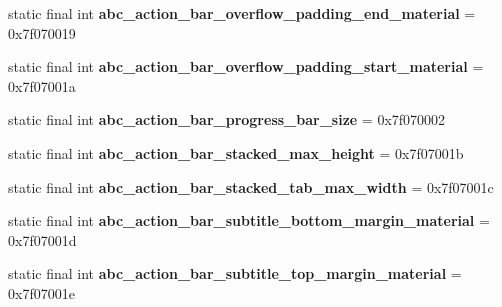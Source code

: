 \begin{DoxyCompactItemize}
\item 
\hypertarget{classandroid_1_1support_1_1v7_1_1appcompat_1_1_r_1_1dimen_a5a92c209ad6132c4236653fc2bef6f45}{}static final int {\bfseries abc\+\_\+action\+\_\+bar\+\_\+overflow\+\_\+padding\+\_\+end\+\_\+material} = 0x7f070019\label{classandroid_1_1support_1_1v7_1_1appcompat_1_1_r_1_1dimen_a5a92c209ad6132c4236653fc2bef6f45}

\item 
\hypertarget{classandroid_1_1support_1_1v7_1_1appcompat_1_1_r_1_1dimen_ab0dff4068408e6b4044c261131d4cc03}{}static final int {\bfseries abc\+\_\+action\+\_\+bar\+\_\+overflow\+\_\+padding\+\_\+start\+\_\+material} = 0x7f07001a\label{classandroid_1_1support_1_1v7_1_1appcompat_1_1_r_1_1dimen_ab0dff4068408e6b4044c261131d4cc03}

\item 
\hypertarget{classandroid_1_1support_1_1v7_1_1appcompat_1_1_r_1_1dimen_a7cb8745e240f51173be9c254cf5fe2b8}{}static final int {\bfseries abc\+\_\+action\+\_\+bar\+\_\+progress\+\_\+bar\+\_\+size} = 0x7f070002\label{classandroid_1_1support_1_1v7_1_1appcompat_1_1_r_1_1dimen_a7cb8745e240f51173be9c254cf5fe2b8}

\item 
\hypertarget{classandroid_1_1support_1_1v7_1_1appcompat_1_1_r_1_1dimen_a895826cc4d8c704a417035e05dd41304}{}static final int {\bfseries abc\+\_\+action\+\_\+bar\+\_\+stacked\+\_\+max\+\_\+height} = 0x7f07001b\label{classandroid_1_1support_1_1v7_1_1appcompat_1_1_r_1_1dimen_a895826cc4d8c704a417035e05dd41304}

\item 
\hypertarget{classandroid_1_1support_1_1v7_1_1appcompat_1_1_r_1_1dimen_ad577ba39fef87f3d70dbf199191d5656}{}static final int {\bfseries abc\+\_\+action\+\_\+bar\+\_\+stacked\+\_\+tab\+\_\+max\+\_\+width} = 0x7f07001c\label{classandroid_1_1support_1_1v7_1_1appcompat_1_1_r_1_1dimen_ad577ba39fef87f3d70dbf199191d5656}

\item 
\hypertarget{classandroid_1_1support_1_1v7_1_1appcompat_1_1_r_1_1dimen_aa35e5ba3767493b71859fbf99eb089ea}{}static final int {\bfseries abc\+\_\+action\+\_\+bar\+\_\+subtitle\+\_\+bottom\+\_\+margin\+\_\+material} = 0x7f07001d\label{classandroid_1_1support_1_1v7_1_1appcompat_1_1_r_1_1dimen_aa35e5ba3767493b71859fbf99eb089ea}

\item 
\hypertarget{classandroid_1_1support_1_1v7_1_1appcompat_1_1_r_1_1dimen_a00dc0188d267f39f6d85e3df16988c20}{}static final int {\bfseries abc\+\_\+action\+\_\+bar\+\_\+subtitle\+\_\+top\+\_\+margin\+\_\+material} = 0x7f07001e\label{classandroid_1_1support_1_1v7_1_1appcompat_1_1_r_1_1dimen_a00dc0188d267f39f6d85e3df16988c20}


\end{DoxyCompactItemize}
